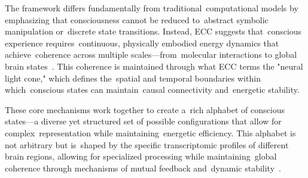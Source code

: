 The framework differs fundamentally from traditional~computational models by emphasizing that consciousness cannot be reduced to~abstract symbolic manipulation or~discrete state transitions. Instead, ECC suggests that~conscious experience requires~continuous, physically embodied energy dynamics that achieve~coherence across multiple scales—from~molecular interactions to global brain states~\cite{freeman2007, breakspear2005dynamics}. This coherence is maintained through what ECC terms the "neural light cone," which defines the~spatial and temporal boundaries within which~conscious states can maintain~causal connectivity and~energetic stability.

These core mechanisms work together to create a~rich alphabet of conscious states—a diverse yet structured set of possible configurations that allow for complex~representation while maintaining~energetic efficiency. This alphabet is not arbitrary but is~shaped by the specific transcriptomic profiles of different brain regions, allowing for specialized processing while maintaining~global coherence through mechanisms of mutual feedback and~dynamic stability~\cite{siletti2023transcriptomic, bakken2021comparative}.


